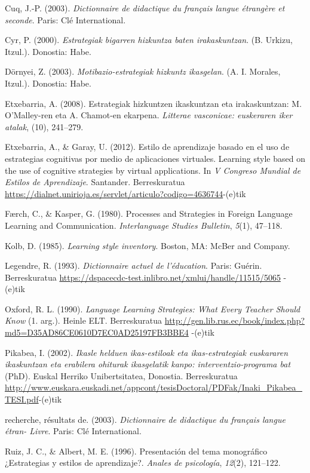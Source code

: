 \documentclass[]{book}
\begin{document}
Cuq, J.-P. (2003). \emph{Dictionnaire de didactique du français langue étrangère et seconde}. Paris: Clé International.

Cyr, P. (2000). \emph{Estrategiak bigarren hizkuntza baten irakaskuntzan}. (B. Urkizu, Itzul.). Donostia: Habe.

Dörnyei, Z. (2003). \emph{Motibazio-estrategiak hizkuntz ikasgelan}. (A. I. Morales, Itzul.). Donostia: Habe.

Etxebarria, A. (2008). Estrategiak hizkuntzen ikaskuntzan eta irakaskuntzan: M. O'Malley-ren eta A. Chamot-en ekarpena. \emph{Litterae vasconicae: euskeraren iker atalak}, (10), 241--279.

Etxebarria, A., \& Garay, U. (2012). Estilo de aprendizaje basado en el uso de estrategias cognitivas por medio de aplicaciones virtuales. Learning style based on the use of cognitive strategies by virtual applications. In \emph{V Congreso Mundial de Estilos de Aprendizaje}. Santander. Berreskuratua \url{https://dialnet.unirioja.es/servlet/articulo?codigo=4636744}-(e)tik

Færch, C., \& Kasper, G. (1980). Processes and Strategies in Foreign Language Learning and Communication. \emph{Interlanguage Studies Bulletin}, \emph{5}(1), 47--118.

Kolb, D. (1985). \emph{Learning style inventory}. Boston, MA: McBer and Company.

Legendre, R. (1993). \emph{Dictionnaire actuel de l'éducation}. Paris: Guérin. Berreskuratua \url{https://dspacecdc-test.inlibro.net/xmlui/handle/11515/5065} -(e)tik

Oxford, R. L. (1990). \emph{Language Learning Strategies: What Every Teacher Should Know} (1. arg.). Heinle ELT. Berreskuratua \url{http://gen.lib.rus.ec/book/index.php?md5=D35AD86CE0610D7EC0AD25197FB3BBE4} -(e)tik

Pikabea, I. (2002). \emph{Ikasle helduen ikas-estiloak eta ikas-estrategiak euskararen ikaskuntzan eta erabilera ohiturak ikasgelatik kanpo: interventzio-programa bat} (PhD). Euskal Herriko Unibertsitatea, Donostia. Berreskuratua \url{http://www.euskara.euskadi.net/appcont/tesisDoctoral/PDFak/Inaki_Pikabea_TESI.pdf}-(e)tik

recherche, résultats de. (2003). \emph{Dictionnaire de didactique du français langue étran- Livre}. Paris: Clé International.

Ruiz, J. C., \& Albert, M. E. (1996). Presentación del tema monográfico ¿Estrategias y estilos de aprendizaje?. \emph{Anales de psicología}, \emph{12}(2), 121--122.
\end{document}
